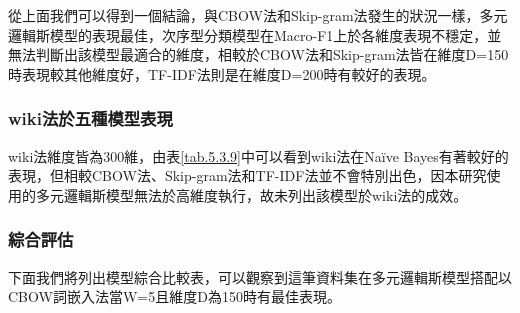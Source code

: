 	從上面我們可以得到一個結論，與CBOW法和Skip-gram法發生的狀況一樣，多元邏輯斯模型的表現最佳，次序型分類模型在Macro-F1上於各維度表現不穩定，並無法判斷出該模型最適合的維度，相較於CBOW法和Skip-gram法皆在維度D=150時表現較其他維度好，TF-IDF法則是在維度D=200時有較好的表現。
	
\subsubsection{wiki法於五種模型表現}

	wiki法維度皆為300維，由表\ref{tab.5.3.9}中可以看到wiki法在Naïve Bayes有著較好的表現，但相較CBOW法、Skip-gram法和TF-IDF法並不會特別出色，因本研究使用的多元邏輯斯模型無法於高維度執行，故未列出該模型於wiki法的成效。
		
\begin{table}[H]
	\footnotesize
    \centering
    \extrarowheight=5pt
    \caption{Wiki法於五種分類模型之比較-英文資料}\label{tab.5.3.9}
\end{table}

\newpage

\subsubsection{綜合評估}


	下面我們將列出模型綜合比較表，可以觀察到這筆資料集在多元邏輯斯模型搭配以CBOW詞嵌入法當W=5且維度D為150時有最佳表現。

